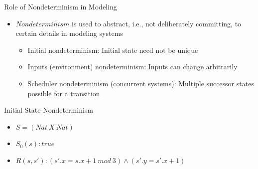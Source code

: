 \documentclass{beamer}
\begin{document}
\begin{frame}{Role of Nondeterminism in Modeling}
\begin{itemize}
\item<1-> $Nondeterminism$ is used to abstract, i.e., not deliberately committing, to certain details in modeling systems
\begin{itemize}
\item<2-> Initial nondeterminism: Initial state need not be unique

\item<3-> Inputs (environment) nondeterminism: Inputs can change arbitrarily

\item<4-> Scheduler nondeterminism (concurrent systems): Multiple successor states possible for a transition

\end{itemize}
\end{itemize}
\end{frame}

\begin{frame}{Initial State Nondeterminism}
 \\
\begin{itemize}
\item<3-> $S = (Nat~X~Nat)$
\item<3-> $S_0(s): true$
\item<3-> $R(s,s'): (s'.x = s.x+1~mod~3) \land (s'.y = s'.x + 1) $
\end{itemize}
\end{frame}
\end{document}
